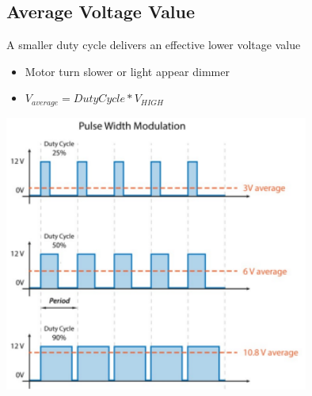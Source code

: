 \documentclass[a4paper,12pt]{article}
\begin{document}
        \subsection{Average Voltage Value}
        A smaller duty cycle delivers an effective lower voltage value
        \begin{itemize}
            \item Motor turn slower or light appear dimmer
            \item $V_{average}=DutyCycle*V_{HIGH}$
        \end{itemize}
        \includegraphics[width=10cm]{AVV.png}
    
\end{document}
